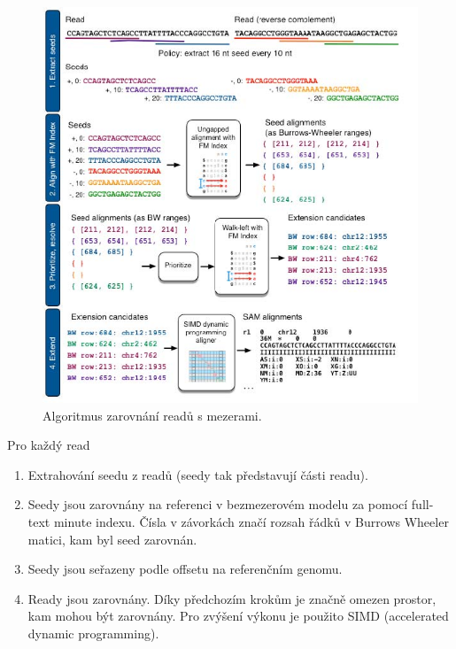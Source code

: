 \documentclass[czech,DP]{thesiskiv}
\numberwithin{equation}{section}
\begin{document}
\begin{figure}[H]		
		\centering
		\includegraphics[width=1\textwidth]{./img/bowtie2_postup.png}
		\caption{Algoritmus zarovnání readů s mezerami. \cite{bowtie2}}
		\label{fig:bowtie_postup}
\end{figure}


\noindent
Pro každý read
\begin{enumerate}
	\item Extrahování seedu z readů (seedy tak představují části readu). 
	\item Seedy jsou zarovnány na referenci v bezmezerovém modelu za pomocí full-text minute indexu. Čísla v závorkách značí rozsah řádků v Burrows Wheeler matici, kam byl seed zarovnán.
	\item Seedy jsou seřazeny podle offsetu na referenčním genomu. 
	\item Ready jsou zarovnány. Díky předchozím krokům je značně omezen prostor, kam mohou být zarovnány. Pro zvýšení výkonu je použito SIMD (accelerated dynamic programming).
\end{enumerate}
  
\end{document}
